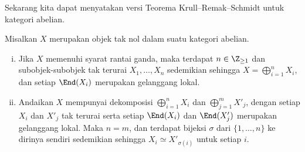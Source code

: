 Sekarang kita dapat menyatakan versi Teorema Krull--Remak--Schmidt untuk
kategori abelian.
\begin{teorema}[M.\ Atiyah]\label{prop:Krull-Schmidt-gen}
	Misalkan $X$ merupakan objek tak nol dalam suatu kategori abelian.
	\begin{enumerate}[(i)]
		\item Jika $X$ memenuhi syarat rantai ganda, maka terdapat
		$n\in\Z_{\geq 1}$ dan subobjek-subobjek tak terurai
		$X_1,\ldots,X_n$ sedemikian sehingga
		$X=\bigoplus_{i=1}^n X_i$, dan setiap $\End(X_i)$ merupakan gelanggang
		lokal.
		\item Andaikan $X$ mempunyai dekomposisi $\bigoplus_{i=1}^n X_i$ dan
		$\bigoplus_{j=1}^m X'_j$, dengan setiap $X_i$ dan $X'_j$ tak terurai
		serta setiap $\End(X_i)$ dan $\End(X'_j)$ merupakan gelanggang lokal.
		Maka $n=m$, dan terdapat bijeksi $\sigma$ dari $\{1,\ldots,n\}$ ke
		dirinya sendiri sedemikian sehingga $X_i\simeq X'_{\sigma(i)}$ untuk
		setiap $i$.
	\end{enumerate}
\end{teorema}
